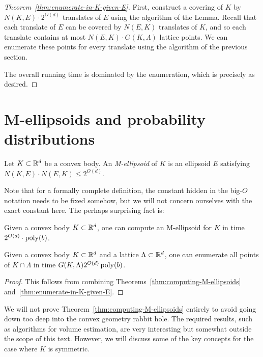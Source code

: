 \begin{proof}[Theorem~\ref{thm:enumerate-in-K-given-E}]
  First, construct a covering of $K$ by $N(K,E) \cdot 2^{O(d)}$ translates of $E$ using the algorithm of the Lemma.
  Recall that each translate of $E$ can be covered by $N(E,K)$ translates of $K$,
  and so each translate contains at most $N(E,K) \cdot G(K,\Lambda)$ lattice points.
  We can enumerate these points for every translate using the algorithm of the previous section.

  The overall running time is dominated by the enumeration,
  which is precisely as desired.
\end{proof}

\section{M-ellipsoids and probability distributions}

\begin{definition}
  Let $K \subset \mathbb{R}^d$ be a convex body.
  An \emph{M-ellipsoid} of $K$ is an ellipsoid $E$ satisfying
  $N(K,E) \cdot N(E,K) \leq 2^{O(d)}$.
\end{definition}

Note that for a formally complete definition,
the constant hidden in the big-$O$ notation needs to be fixed somehow,
but we will not concern ourselves with the exact constant here.
The perhaps surprising fact is:

\begin{theorem}
  \label{thm:computing-M-ellipsoids}
  Given a convex body $K \subset \mathbb{R}^d$,
  one can compute an M-ellipsoid for $K$
  in time $2^{O(d)} \cdot \operatorname{poly}(b)$.
\end{theorem}

\begin{corollary}
  Given a convex body $K \subset \mathbb{R}^d$ and a lattice $\Lambda \subset \mathbb{R}^d$, one can enumerate all points of
  $K \cap \Lambda$ in time $G(K, \Lambda) 2^{O(d)} \operatorname{poly}(b)$.
\end{corollary}
\begin{proof}
  This follows from combining Theorems~\ref{thm:computing-M-ellipsoids} and~\ref{thm:enumerate-in-K-given-E}.
\end{proof}

We will not prove Theorem~\ref{thm:computing-M-ellipsoids} entirely
to avoid going down too deep into the convex geometry rabbit hole.
The required results, such as algorithms for volume estimation,
are very interesting but somewhat outside the scope of this text.
However, we will discuss some of the key concepts for the case where $K$ is symmetric.

